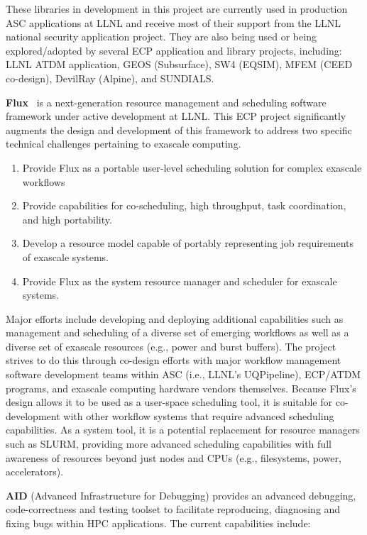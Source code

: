 These libraries in development in this project are currently used in
production ASC applications at 
LLNL and receive most of their support from the LLNL national security
application project. They are also being used or being explored/adopted
by several ECP application and library projects, including: LLNL ATDM
application, GEOS (Subsurface), SW4 (EQSIM), MFEM (CEED co-design),
DevilRay (Alpine), and SUNDIALS.

\textbf{Flux}~\cite{Ahn:2014:Flux,FluxSC18} is a next-generation resource
management and scheduling software framework under active development at
LLNL. This ECP project significantly augments the design and development
of this framework to address two specific technical challenges pertaining
to exascale computing.

\begin{enumerate}
\item Provide Flux as a portable user-level scheduling solution for complex
      exascale workflows

\item Provide capabilities for co-scheduling, high throughput, task
      coordination, and high portability.

\item Develop a resource model capable of portably representing job
      requirements of exascale systems.

\item Provide Flux as the system resource manager and scheduler for exascale
      systems.
\end{enumerate}

Major efforts include developing and deploying additional capabilities
such as management and scheduling of a diverse set of emerging workflows
as well as a diverse set of exascale resources (e.g., power and burst
buffers). The project strives to do this through co-design efforts with
major workflow management software development teams within ASC (i.e.,
LLNL’s UQPipeline), ECP/ATDM programs, and exascale computing hardware
vendors themselves. Because Flux’s design allows it to be used as a
user-space scheduling tool, it is suitable for co-development with other
workflow systems that require advanced scheduling capabilities. As a
system tool, it is a potential replacement for resource managers such as
SLURM, providing more advanced scheduling capabilities with full
awareness of resources beyond just nodes and CPUs (e.g., filesystems,
power, accelerators).

\textbf{AID} (Advanced Infrastructure for Debugging) provides an advanced
debugging, code-correctness and testing toolset to facilitate
reproducing, diagnosing and fixing bugs within HPC applications. The
current capabilities include:

